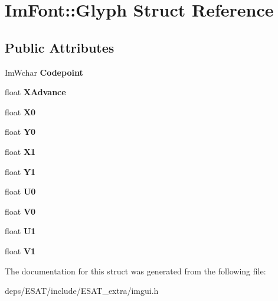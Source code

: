 \hypertarget{struct_im_font_1_1_glyph}{}\section{Im\+Font\+:\+:Glyph Struct Reference}
\label{struct_im_font_1_1_glyph}
\subsection*{Public Attributes}
\begin{DoxyCompactItemize}
\item 
\mbox{\label{struct_im_font_1_1_glyph_a9d612199d341de86cb7b0c33539b4830}} 
Im\+Wchar {\bfseries Codepoint}
\item 
\mbox{\label{struct_im_font_1_1_glyph_ab09eb257d6cc68385654a25ba167894f}} 
float {\bfseries X\+Advance}
\item 
\mbox{\label{struct_im_font_1_1_glyph_ae4e362012824c54d41ff7fbff46cf88b}} 
float {\bfseries X0}
\item 
\mbox{\label{struct_im_font_1_1_glyph_ad7f9c0b94f16cecb62109d5a73d8cb8b}} 
float {\bfseries Y0}
\item 
\mbox{\label{struct_im_font_1_1_glyph_ac1e7bc71d1f235fe3c993ba163e65f56}} 
float {\bfseries X1}
\item 
\mbox{\label{struct_im_font_1_1_glyph_ab5e51179eeaef0849befcbf69ecaa669}} 
float {\bfseries Y1}
\item 
\mbox{\label{struct_im_font_1_1_glyph_a6e78ab35f36e7eee16c85e60eb9d445a}} 
float {\bfseries U0}
\item 
\mbox{\label{struct_im_font_1_1_glyph_a7de7fe9f4420b1c8336419a1739ff20a}} 
float {\bfseries V0}
\item 
\mbox{\label{struct_im_font_1_1_glyph_a9e443ec24dc105b512ae57737e43af84}} 
float {\bfseries U1}
\item 
\mbox{\label{struct_im_font_1_1_glyph_a803ff02b149bd2795f3d90fc601706ef}} 
float {\bfseries V1}
\end{DoxyCompactItemize}


The documentation for this struct was generated from the following file\+:\begin{DoxyCompactItemize}
\item 
deps/\+E\+S\+A\+T/include/\+E\+S\+A\+T\+\_\+extra/imgui.\+h\end{DoxyCompactItemize}
